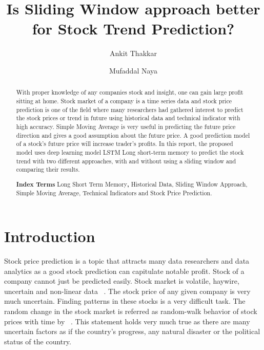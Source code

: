 \documentclass[5p,,preprint,12pt,twocolumn]{elsarticle}
\begin{document}


\begin{frontmatter}
	
\title{Is Sliding Window approach better for Stock Trend Prediction?
}
    
\author[]{Ankit Thakkar}
\author[]{Mufaddal Naya}
    

\begin{abstract}
With proper knowledge of any companies stock and insight, one can gain large profit sitting at home. Stock market of a company is a time series data and stock price prediction is one of the field where many researchers had gathered interest to predict the stock prices or trend in future using historical data and technical indicator with high accuracy. Simple Moving Average is very useful in predicting the future price direction and gives a good assumption about the future price. A good prediction model of a stock's future price will increase trader's profits. In this report, the proposed model uses deep learning model LSTM {\textemdash} Long short-term memory to predict the stock trend with two different approaches, with and without using a sliding window and comparing their results.

\textbf{Index Terms}{\textendash} Long Short Term Memory\textbf{,} Historical Data, Sliding Window Approach, Simple Moving Average, Technical Indicators and Stock Price Prediction.
\end{abstract}
\end{frontmatter}
    
\section{Introduction}
Stock price prediction is a topic that attracts many data researchers and data analytics as a good stock prediction can capitulate notable profit. Stock of a company cannot just be predicted easily. Stock market is volatile, haywire, uncertain and non-linear data \unskip~\cite{490201:11043943}. The stock price of any given company is very much uncertain. Finding patterns in these stocks is a very difficult task. The random change in the stock market is referred as random-walk behavior of stock prices with time by \unskip~\cite{490201:11043765}. This statement holds very much true as there are many uncertain factors as if the country's progress, any natural disaster or the political status of the country.
\end{document}
